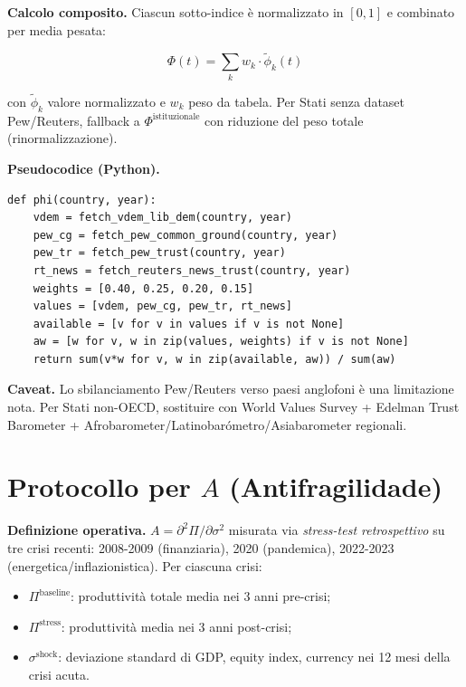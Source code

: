 \Proved{} \textbf{Calcolo composito.} Ciascun sotto-indice è
normalizzato in \([0, 1]\) e combinato per media pesata:

\[
\Phi(t) = \sum_k w_k \cdot \tilde{\phi}_k(t)
\]

con \(\tilde{\phi}_k\) valore normalizzato e \(w_k\) peso da tabela.
Per Stati senza dataset Pew/Reuters, fallback a
\(\Phi^{\text{istituzionale}}\) con riduzione del peso totale
(rinormalizzazione).

\Hypoth{} \textbf{Pseudocodice (Python).}

\begin{verbatim}
def phi(country, year):
    vdem = fetch_vdem_lib_dem(country, year)
    pew_cg = fetch_pew_common_ground(country, year)
    pew_tr = fetch_pew_trust(country, year)
    rt_news = fetch_reuters_news_trust(country, year)
    weights = [0.40, 0.25, 0.20, 0.15]
    values = [vdem, pew_cg, pew_tr, rt_news]
    available = [v for v in values if v is not None]
    aw = [w for v, w in zip(values, weights) if v is not None]
    return sum(v*w for v, w in zip(available, aw)) / sum(aw)
\end{verbatim}

\Conj{} \textbf{Caveat.} Lo sbilanciamento Pew/Reuters verso paesi
anglofoni è una limitazione nota. Per Stati non-OECD, sostituire con
World Values Survey + Edelman Trust Barometer +
Afrobarometer/Latinobarómetro/Asiabarometer regionali.



\section{\texorpdfstring{Protocollo per \(A\)
(Antifragilidade)}{Protocollo per A (Antifragilidade)}}\label{protocollo-per-a-antifragilituxe0}

\Hypoth{} \textbf{Definizione operativa.}
\(A = \partial^2\Pi/\partial\sigma^2\) misurata via \emph{stress-test
retrospettivo} su tre crisi recenti: 2008-2009 (finanziaria), 2020
(pandemica), 2022-2023 (energetica/inflazionistica). Per ciascuna crisi:

\begin{itemize}
\tightlist
\item
  \(\Pi^{\text{baseline}}\): produttività totale media nei 3 anni
  pre-crisi;
\item
  \(\Pi^{\text{stress}}\): produttività media nei 3 anni post-crisi;
\item
  \(\sigma^{\text{shock}}\): deviazione standard di GDP, equity index,
  currency nei 12 mesi della crisi acuta.
\end{itemize}

